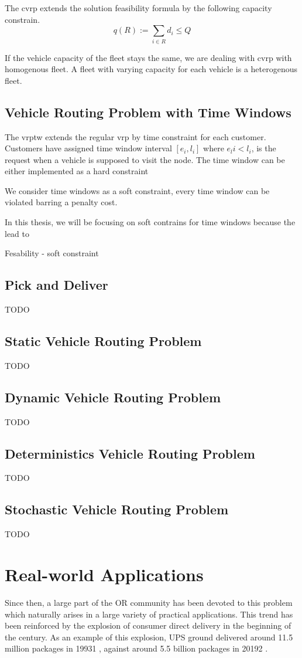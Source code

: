     The \gls{cvrp} extends the solution feasibility formula by the following capacity constrain.
    \begin{equation}
        q(R) := \sum_{i \in R} d_i \leq Q
    \end{equation}
    
    If the vehicle capacity of the fleet stays the same, we are dealing with \gls{cvrp} with homogenous fleet. A fleet with varying capacity for each vehicle is a heterogenous fleet.
    
    \subsection{Vehicle Routing Problem with Time Windows}
    The \gls{vrptw} extends the regular \gls{vrp} by time constraint for each customer. Customers have assigned time window interval $[e_i, l_i]$ where $e_li < l_i$, is the request when a vehicle is supposed to visit the node. The time window can be either implemented as a hard constraint
    
    We consider time windows as a soft constraint, every time window can be violated barring a penalty cost. 
    
    In this thesis, we will be focusing on soft contrains for time windows because the lead to 
    
    Fesability - soft constraint
    
    \subsection{Pick and Deliver}
    TODO
    \subsection{Static Vehicle Routing Problem}
    TODO
    \subsection{Dynamic Vehicle Routing Problem}
    TODO
    \subsection{Deterministics Vehicle Routing Problem}
    TODO
    \subsection{Stochastic Vehicle Routing Problem}
    TODO
    
\section{Real-world Applications}
 Since then, a large part of the OR community has been devoted
to this problem which naturally arises in a large variety of practical applications. This
trend has been reinforced by the explosion of consumer direct delivery in the beginning of
the century. As an example of this explosion, UPS ground delivered around 11.5 million
packages in 19931
, against around 5.5 billion packages in 20192
.

